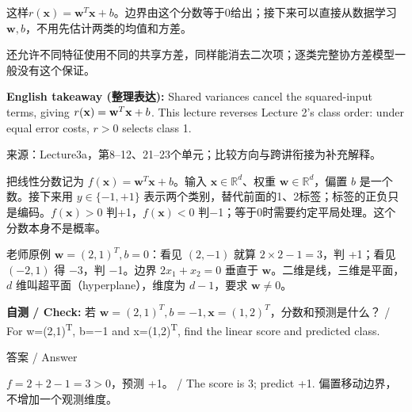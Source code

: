 这样\(r(\mathbf x)=\mathbf w^T\mathbf x+b\)。边界由这个分数等于0给出；接下来可以直接从数据学习\(\mathbf w,b\)，不用先估计两类的均值和方差。


还允许不同特征使用不同的共享方差，同样能消去二次项；逐类完整协方差模型一般没有这个保证。


\textbf{English takeaway (整理表达):} Shared variances cancel the squared-input terms, giving \(r(\mathbf x)=\nobreak\mathbf w^T\mathbf x+b\). This lecture reverses Lecture 2’s class order: under equal error costs, \(r>0\) selects class 1.


来源：Lecture3a，第8–12、21–23个单元；比较方向与跨讲衔接为补充解释。





把线性分数记为 \(f(\mathbf x)=\mathbf w^T\mathbf x+b\)。输入 \(\mathbf x\in\mathbb R^d\)、权重 \(\mathbf w\in\mathbb R^d\)，偏置 \(b\) 是一个数。接下来用 \(y\in\{-1,+1\}\) 表示两个类别，替代前面的1、2标签；标签的正负只是编码。\(f(\mathbf x)>0\) 判+1，\(f(\mathbf x)<0\) 判\ensuremath{-}1；等于0时需要约定平局处理。这个分数本身不是概率。


老师原例 \(\mathbf w=(2,1)^T,b=0\)：看见 \((2,-1)\) 就算 \(2\times2-1=3\)，判 +1；看见 \((-2,1)\) 得 \ensuremath{-}3，判 \ensuremath{-}1。边界 \(2x_1+x_2=0\) 垂直于 \(\mathbf w\)。二维是线，三维是平面，\(d\) 维叫超平面（hyperplane），维度为 \(d-1\)，要求 \(\mathbf w\ne0\)。






\textbf{自测 / Check:} 若 \(\mathbf w=(2,1)^T,b=-1,\mathbf x=(1,2)^T\)，分数和预测是什么？ / For w=(2,1)\textsuperscript{T}, b=\ensuremath{-}1 and x=(1,2)\textsuperscript{T}, find the linear score and predicted class.



\begin{StudySolution}{答案 / Answer}


\(f=2+2-1=3>0\)，预测 +1。 / The score is 3; predict +1. 偏置移动边界，不增加一个观测维度。


\end{StudySolution}


